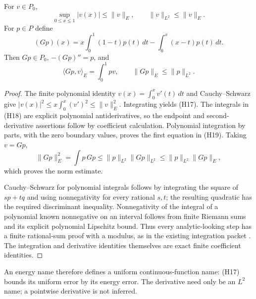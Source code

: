 \begin{lemma}
\label{lem:green}
For \(v\in P_0\),
\[
          \sup_{0\leq x\leq1}|v(x)|\leq\|v\|_E,\qquad
          \|v\|_{L^2}\leq\|v\|_E .
\tag{H17}
\]
For \(p\in P\) define
\[
(Gp)(x)=x\int_0^1(1-t)p(t)\,dt-\int_0^x(x-t)p(t)\,dt .
\tag{H18}
\]
Then \(Gp\in P_0\), \(-(Gp)''=p\), and
\[
  \langle Gp,v\rangle_E=\int_0^1p v,\qquad
  \|Gp\|_E\leq\|p\|_{L^2}.
\tag{H19}
\]
\end{lemma}
\begin{proof}
The finite polynomial identity \(v(x)=\int_0^x v'(t)\,dt\) and
Cauchy--Schwarz give
\(|v(x)|^2\leq x\int_0^x(v')^2\leq\|v\|_E^2\).
Integrating yields (H17). The integrals in (H18) are explicit polynomial
antiderivatives, so the endpoint and second-derivative assertions follow
by coefficient calculation. Polynomial integration by parts, with the
zero boundary values, proves the first equation in (H19). Taking \(v=Gp\),
\[
\|Gp\|_E^2=\int p\,Gp
 \leq\|p\|_{L^2}\|Gp\|_{L^2}
 \leq\|p\|_{L^2}\|Gp\|_E,
\]
which proves the norm estimate.

Cauchy--Schwarz for polynomial integrals follows by integrating the square
of \(sp+tq\) and using nonnegativity for every rational \(s,t\); the resulting
quadratic has the required discriminant inequality. Nonnegativity of the
integral of a polynomial known nonnegative on an interval follows from
finite Riemann sums and its explicit polynomial Lipschitz bound. Thus every
analytic-looking step has a finite rational-sum proof with a modulus, as in
the existing integration packet \cite{repoFramework}. The integration and
derivative identities themselves are exact finite coefficient identities.
\end{proof}

An energy name therefore defines a uniform continuous-function name:
(H17) bounds its uniform error by its energy error. The derivative need only
be an \(L^2\) name; a pointwise derivative is not inferred.

